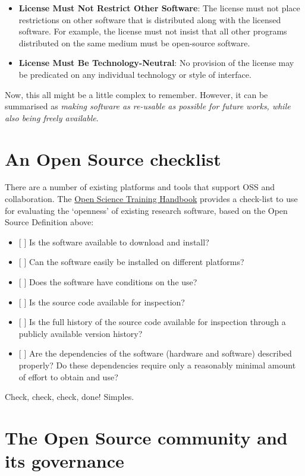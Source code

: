 \documentclass[]{book}
\begin{document}
\begin{itemize}
\item
  \textbf{License Must Not Restrict Other Software}: The license must not place restrictions on other software that is distributed along with the licensed software. For example, the license must not insist that all other programs distributed on the same medium must be open-source software.
\item
  \textbf{License Must Be Technology-Neutral}: No provision of the license may be predicated on any individual technology or style of interface.
\end{itemize}

Now, this all might be a little complex to remember. However, it can be summarised as \emph{making software as re-usable as possible for future works, while also being freely available}.

\hypertarget{an-open-source-checklist}{%
\section{An Open Source checklist}\label{an-open-source-checklist}}

There are a number of existing platforms and tools that support OSS and collaboration. The \href{https://open-science-training-handbook.gitbook.io/book/}{Open Science Training Handbook} provides a check-list to use for evaluating the `openness' of existing research software, based on the Open Source Definition above:

\begin{itemize}
\item
  {[} {]} Is the software available to download and install?
\item
  {[} {]} Can the software easily be installed on different platforms?
\item
  {[} {]} Does the software have conditions on the use?
\item
  {[} {]} Is the source code available for inspection?
\item
  {[} {]} Is the full history of the source code available for inspection through a publicly available version history?
\item
  {[} {]} Are the dependencies of the software (hardware and software) described properly? Do these dependencies require only a reasonably minimal amount of effort to obtain and use?
\end{itemize}

Check, check, check, done! Simples.

\hypertarget{the-open-source-community-and-its-governance}{%
\section{The Open Source community and its governance }\label{the-open-source-community-and-its-governance}}
\end{document}
